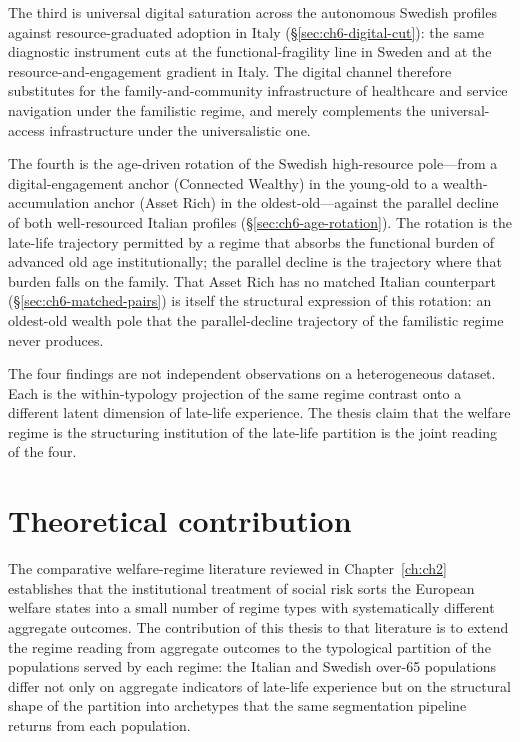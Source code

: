 The third is universal digital saturation across the autonomous Swedish profiles against resource-graduated adoption in Italy (\S\ref{sec:ch6-digital-cut}): the same diagnostic instrument cuts at the functional-fragility line in Sweden and at the resource-and-engagement gradient in Italy. The digital channel therefore substitutes for the family-and-community infrastructure of healthcare and service navigation under the familistic regime, and merely complements the universal-access infrastructure under the universalistic one.

The fourth is the age-driven rotation of the Swedish high-resource pole---from a digital-engagement anchor (Connected Wealthy) in the young-old to a wealth-accumulation anchor (Asset Rich) in the oldest-old---against the parallel decline of both well-resourced Italian profiles (\S\ref{sec:ch6-age-rotation}). The rotation is the late-life trajectory permitted by a regime that absorbs the functional burden of advanced old age institutionally; the parallel decline is the trajectory where that burden falls on the family. That Asset Rich has no matched Italian counterpart (\S\ref{sec:ch6-matched-pairs}) is itself the structural expression of this rotation: an oldest-old wealth pole that the parallel-decline trajectory of the familistic regime never produces.

The four findings are not independent observations on a heterogeneous dataset. Each is the within-typology projection of the same regime contrast onto a different latent dimension of late-life experience. The thesis claim that the welfare regime is the structuring institution of the late-life partition is the joint reading of the four.

\section{Theoretical contribution}
\label{sec:ch9-theory}

The comparative welfare-regime literature reviewed in Chapter~\ref{ch:ch2} establishes that the institutional treatment of social risk sorts the European welfare states into a small number of regime types with systematically different aggregate outcomes. The contribution of this thesis to that literature is to extend the regime reading from aggregate outcomes to the typological partition of the populations served by each regime: the Italian and Swedish over-65 populations differ not only on aggregate indicators of late-life experience but on the structural shape of the partition into archetypes that the same segmentation pipeline returns from each population.

